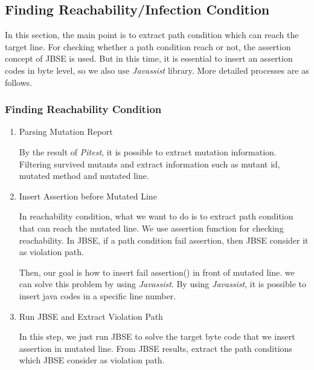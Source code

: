 \documentclass{article}
\begin{document}
\subsection{Finding Reachability/Infection Condition}

\iffalse
Reachability를 찾기위한 과정
1. mutant에 대한 정보 파싱 -> survived mutants Id
2. mutation report에 method와 line에 assertion 삽입 -> javassist
3. run jbse -> parse report(violation 기준)
4. violation 리포트를 가지고 sovle -> reachability condition!

Infection condtiion을 찾는 과정
1. reachability condition으로 assume
2. mutated line 다음에 assume 삽입
3. 다시 violation을 일으키는 path condition solve
\fi

In this section, the main point is to extract path condition which can reach the target line. For checking whether a path condition reach or not, the assertion concept of JBSE is used. But in this time, it is essential to insert an assertion codes in byte level, so we also use \emph{Javassist} library. More detailed processes are as follows.
\subsubsection{Finding Reachability Condition}
\begin{enumerate}
    \item Parsing Mutation Report
    
    By the result of \emph{Pitest}, it is possible to extract mutation information. Filtering survived mutants and extract information such as mutant id, mutated method and mutated line.
    \item Insert Assertion before Mutated Line
    
    In reachability condition, what we want to do is to extract path condition that can reach the mutated line. We use assertion function for checking reachability. In JBSE, if a path condition fail assertion, then JBSE consider it as violation path.
    
    Then, our goal is how to insert fail assertion() in front of mutated line. we can solve this problem by using \emph{Javassist}. By using \emph{Javassist}, it is possible to insert java codes in a specific line number.
    \item Run JBSE and Extract Violation Path
    
    In this step, we just run JBSE to solve the target byte code that we insert assertion in mutated line. From JBSE results, extract the path conditions which JBSE consider as violation path.
\end{enumerate}
\end{document}
